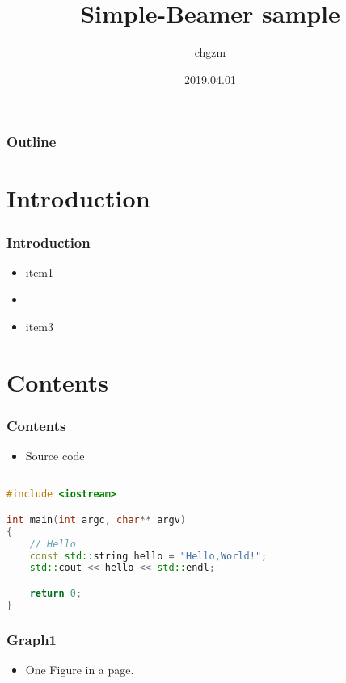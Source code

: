 \documentclass[12pt]{beamer}
\begin{document}
\title{Simple-Beamer sample}
\author{{\large chgzm}}
\date{2019.04.01}

\begin{frame}
  \titlepage
\end{frame}

\begin{frame}
  \frametitle{Outline}

  \tableofcontents
\end{frame}

\section{Introduction}
\begin{frame}
  \frametitle{Introduction}

  \begin{itemize}
    \item item1
    \item {}
    \item \alert{item3}
  \end{itemize}
\end{frame}

\section{Contents}

\begin{frame}[fragile]
  \frametitle{Contents}

  \begin{itemize}
    \item Source code 
  \end{itemize}

  \begin{lstlisting}[language={C++}]

#include <iostream>

int main(int argc, char** argv)
{
    // Hello
    const std::string hello = "Hello,World!";
    std::cout << hello << std::endl;

    return 0;
}

  \end{lstlisting}
\end{frame}

\begin{frame}
  \frametitle{Graph1}

  \begin{itemize}
    \item One Figure in a page.
  \end{itemize}

\end{frame}
\end{document}

